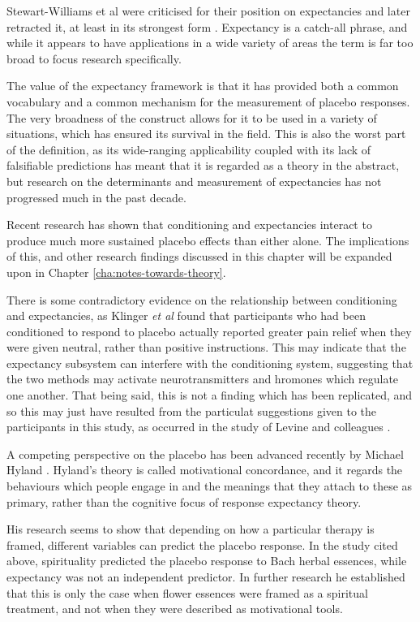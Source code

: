 Stewart-Williams et al were criticised for their position on expectancies \cite{Kirsch2004}  and later retracted it, at least in its strongest form \cite{Stewart-Williams2004}. Expectancy is a catch-all phrase, and while it appears to have applications in a wide variety of areas \cite{Montgomery2007} the term is far too broad to focus research specifically. 

The value of the expectancy framework is that it has provided both a common vocabulary and a common mechanism for the measurement of placebo responses. The very broadness of the construct allows for it to be used in a variety of situations, which has ensured its survival in the field. This is also the worst part of the definition, as its wide-ranging applicability coupled with its lack of falsifiable predictions has meant that it is regarded as a theory in the abstract, but research on the determinants and measurement of expectancies has not progressed much in the past decade. 

Recent research has shown that conditioning and expectancies interact to produce much more sustained placebo effects than either alone. The implications of this, and other research findings discussed in this chapter will be expanded upon in Chapter \ref{cha:notes-towards-theory}. 

There is some contradictory evidence on the relationship between conditioning and expectancies, as Klinger \textit{et al} \cite{Klinger2007a} found that participants who had been conditioned to respond to placebo actually reported greater pain relief when they were given neutral, rather than positive instructions. This may indicate that the expectancy subsystem can interfere with the conditioning system, suggesting that the two methods may activate neurotransmitters and hromones which regulate one another. That being said, this is not a finding which has been replicated, and so this may just have resulted from the particulat suggestions given to the participants in this study, as occurred in the study of Levine and colleagues \cite{Levine2006}. 

A competing perspective on the placebo has been advanced recently by Michael Hyland \cite{Hyland2006}. Hyland's theory is called motivational concordance, and it regards  the behaviours which people engage in and the meanings that they attach to these as primary,  rather than the cognitive focus of response expectancy theory.  

His research seems to show that depending on how a particular therapy is framed, different variables can predict the placebo response.  In the study cited above, spirituality predicted the placebo response to Bach herbal essences, while expectancy was not an independent predictor. In further research \cite{Hyland2007} he established that this is only the case when flower essences were framed as a spiritual treatment, and not when they were described as motivational tools. 

